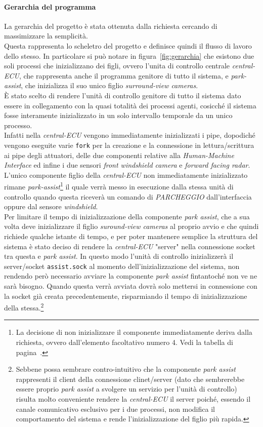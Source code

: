 \documentclass[11pt, openany]{article}
\theoremstyle{definition}
\theoremstyle{plain}
\theoremstyle{remark}
\begin{document}
		\paragraph{Gerarchia del programma}
			La gerarchia del progetto è stata ottenuta dalla richiesta cercando di massimizzare la semplicità.\\
			Questa rappresenta lo scheletro del progetto e definisce quindi il flusso di lavoro dello stesso. In particolare si può notare in figura~\ref{fig:gerarchia} che esistono due soli processi che inizializzano dei figli, ovvero l'unita di controllo centrale \textit{central-ECU}, che rappresenta anche il programma genitore di tutto il sistema, e \textit{park-assist}, che inizializza il suo unico figlio \textit{surround-view cameras}.\\
			È stato scelto di rendere l'unità di controllo genitore di tutto il sistema dato essere in collegamento con la quasi totalità dei processi agenti, cosicché il sistema fosse interamente inizializzato in un solo intervallo temporale da un unico processo.\\
			Infatti nella \textit{central-ECU} vengono immediatamente inizializzati i pipe, dopodiché vengono eseguite varie \texttt{fork} per la creazione e la connessione in lettura/scrittura ai pipe degli attuatori, delle due componenti relative alla \textit{Human-Machine Interface} ed infine i due sensori \textit{front windshield camera} e \textit{forward facing radar}. L'unico componente figlio della \textit{central-ECU} non immediatamente inizializzato rimane \textit{park-assist}\footnote{La decisione di non inizializzare il componente immediatamente deriva dalla richiesta, ovvero dall'elemento facoltativo numero 4. Vedi la tabella di pagina~\pageref{tab:facoltativi}.} il quale verrà messo in esecuzione dalla stessa unità di controllo quando questa riceverà un comando di \textit{PARCHEGGIO} dall'interfaccia oppure dal sensore \textit{windshield}.\\
			Per limitare il tempo di inizializzazione della componente \textit{park assist}, che a sua volta deve inizializzare il figlio \textit{suround-view cameras} al proprio avvio e che quindi richiede qualche istante di tempo, e per poter mantenere semplice la struttura del sistema è stato deciso di rendere la \textit{central-ECU} "server" nella connessione socket tra questa e \textit{park assist}. In questo modo l'unità di controllo inizializzerà il server/socket \texttt{assist.sock} al momento dell'inizializzazione del sistema, non rendendo però necessario avviare la componente \textit{park assist} fintantoché non ve ne sarà bisogno. Quando questa verrà avviata dovrà solo mettersi in connessione con la socket già creata precedentemente, risparmiando il tempo di inizializzazione della stessa.\footnote{Sebbene possa sembrare contro-intuitivo che la componente \textit{park assist} rappresenti il client della connessione clinet/server (dato che sembrerebbe essere proprio \textit{park assist} a svolgere un servizio per l'unità di controllo) risulta molto conveniente rendere la \textit{central-ECU} il server poiché, essendo il canale comunicativo esclusivo per i due processi, non modifica il comportamento del sistema e rende l'inizializzazione del figlio più rapida.}\\
\end{document}

